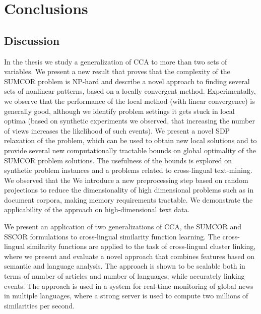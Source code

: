 %
\chapter{Conclusions}\label{chap:conclusions}

\section{Discussion}

In the thesis we study a generalization of CCA to more than two
sets of variables. We present a new result that proves that
the complexity of the SUMCOR problem
is NP-hard and describe a novel approach to finding several sets
of nonlinear patterns, based on a locally convergent method.
Experimentally, we observe that the
performance of the local method (with linear convergence) is
generally good, although we identify problem settings it gets
stuck in local optima (based on synthetic experiments we observed, 
that increasing the number of views increases the likelihood of such events).
We present a novel SDP relaxation of the problem, which can be used to obtain new
local solutions and to provide several new computationally tractable bounds on
global optimality of the SUMCOR problem solutions.
The usefulness of the bounds is explored on synthetic problem
instances and a problems related to cross-lingual text-mining.
We observed that the 
We introduce a new preprocessing step based on random
projections to reduce the dimensionality of high dimensional problems
such as in document corpora, making memory requirements tractable.
We demonstrate the applicability of the approach on high-dimensional
text data.

We present an application of two generalizations of CCA, the
SUMCOR and SSCOR formulations to cross-lingual similarity function
learning. The cross-lingual similarity functions are applied to
the task of cross-lingual cluster linking, where we present and evaluate a novel
approach that combines features based on semantic and language analysis.
The approach is shown to be scalable both in
terms of number of articles and number of languages, while accurately linking events.
The approach is used in a system for real-time monitoring of global news in
multiple languages, where a strong server is used to compute two millions
of similarities per second.

